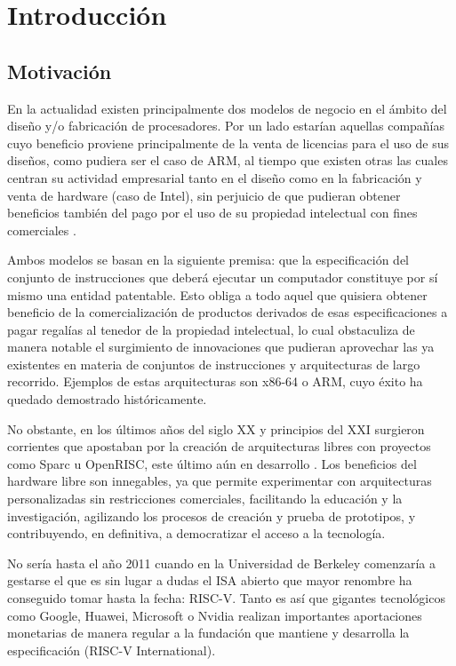 \chapter{Introducción}


\section{Motivación}

En la actualidad existen principalmente dos modelos de negocio en el ámbito del diseño y/o fabricación de procesadores. Por un lado estarían aquellas compañías cuyo beneficio proviene principalmente de la venta de licencias para el uso de sus diseños, como pudiera ser el caso de ARM, al tiempo que existen otras las cuales centran su actividad empresarial tanto en el diseño como en la fabricación y venta de hardware (caso de Intel), sin perjuicio de que pudieran obtener beneficios también del pago por el uso de su propiedad intelectual con fines comerciales \cite{armBusinessModel}.

Ambos modelos se basan en la siguiente premisa: que la especificación del conjunto de instrucciones que deberá ejecutar un computador constituye por sí mismo una entidad patentable. Esto obliga a todo aquel que quisiera obtener beneficio de la comercialización de productos derivados de esas especificaciones a pagar regalías al tenedor de la propiedad intelectual, lo cual obstaculiza de manera notable el surgimiento de innovaciones que pudieran aprovechar las ya existentes en materia de conjuntos de instrucciones y arquitecturas de largo recorrido. Ejemplos de estas arquitecturas son x86-64 o ARM, cuyo éxito ha quedado demostrado históricamente.

No obstante, en los últimos años del siglo XX y principios del XXI surgieron corrientes que apostaban por la creación de arquitecturas libres con proyectos como Sparc u OpenRISC, este último aún en desarrollo \cite{openrisc}. Los beneficios del hardware libre son innegables, ya que permite experimentar con arquitecturas personalizadas sin restricciones comerciales, facilitando la educación y la investigación, agilizando los procesos de creación y prueba de prototipos, y contribuyendo, en definitiva, a democratizar el acceso a la tecnología.

No sería hasta el año 2011 \cite{geneology} cuando en la Universidad de Berkeley comenzaría a gestarse el que es sin lugar a dudas el ISA abierto que mayor renombre ha conseguido tomar hasta la fecha: RISC-V. Tanto es así que gigantes tecnológicos como Google, Huawei, Microsoft o Nvidia \cite{partners} realizan importantes aportaciones monetarias de manera regular a la fundación que mantiene y desarrolla la especificación (RISC-V International).

